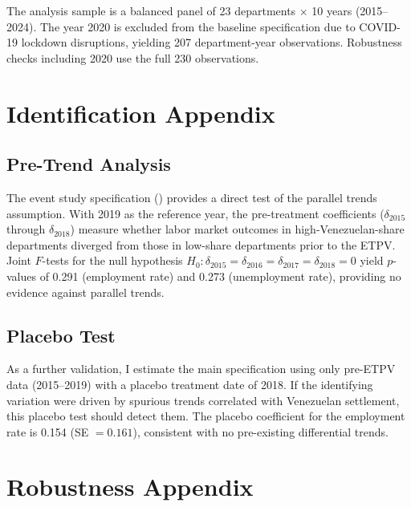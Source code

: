 \documentclass[12pt]{article}
\begin{document}
The analysis sample is a balanced panel of 23 departments $\times$ 10 years (2015--2024). The year 2020 is excluded from the baseline specification due to COVID-19 lockdown disruptions, yielding 207 department-year observations. Robustness checks including 2020 use the full 230 observations.

\section{Identification Appendix}
\label{sec:id_appendix}

\subsection{Pre-Trend Analysis}

The event study specification () provides a direct test of the parallel trends assumption. With 2019 as the reference year, the pre-treatment coefficients ($\delta_{2015}$ through $\delta_{2018}$) measure whether labor market outcomes in high-Venezuelan-share departments diverged from those in low-share departments prior to the ETPV. Joint $F$-tests for the null hypothesis $H_0: \delta_{2015} = \delta_{2016} = \delta_{2017} = \delta_{2018} = 0$ yield $p$-values of 0.291 (employment rate) and 0.273 (unemployment rate), providing no evidence against parallel trends.

\subsection{Placebo Test}

As a further validation, I estimate the main specification using only pre-ETPV data (2015--2019) with a placebo treatment date of 2018. If the identifying variation were driven by spurious trends correlated with Venezuelan settlement, this placebo test should detect them. The placebo coefficient for the employment rate is 0.154 (SE $= 0.161$), consistent with no pre-existing differential trends.

\section{Robustness Appendix}
\label{sec:robust_appendix}
\end{document}
